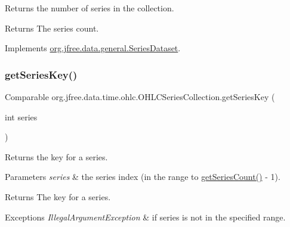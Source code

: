Returns the number of series in the collection.

\begin{DoxyReturn}{Returns}
The series count. 
\end{DoxyReturn}


Implements \mbox{\hyperlink{interfaceorg_1_1jfree_1_1data_1_1general_1_1_series_dataset_a84fe822f5918f941d9de1ed1b73c9f58}{org.\+jfree.\+data.\+general.\+Series\+Dataset}}.

\mbox{\label{classorg_1_1jfree_1_1data_1_1time_1_1ohlc_1_1_o_h_l_c_series_collection_af718b6938348563aade08cce5f70d143}} 
\subsubsection{\texorpdfstring{get\+Series\+Key()}{getSeriesKey()}}
{\footnotesize\ttfamily Comparable org.\+jfree.\+data.\+time.\+ohlc.\+O\+H\+L\+C\+Series\+Collection.\+get\+Series\+Key (\begin{DoxyParamCaption}\item[{int}]{series }\end{DoxyParamCaption})}

Returns the key for a series.


\begin{DoxyParams}{Parameters}
{\em series} & the series index (in the range {} to {\ttfamily \mbox{\hyperlink{classorg_1_1jfree_1_1data_1_1time_1_1ohlc_1_1_o_h_l_c_series_collection_aa6b3cf5922a008e3c39d01282a008a6e}{get\+Series\+Count()}} -\/ 1}).\\
\hline
\end{DoxyParams}
\begin{DoxyReturn}{Returns}
The key for a series.
\end{DoxyReturn}

\begin{DoxyExceptions}{Exceptions}
{\em Illegal\+Argument\+Exception} & if {\ttfamily series} is not in the specified range. \\
\hline
\end{DoxyExceptions}


